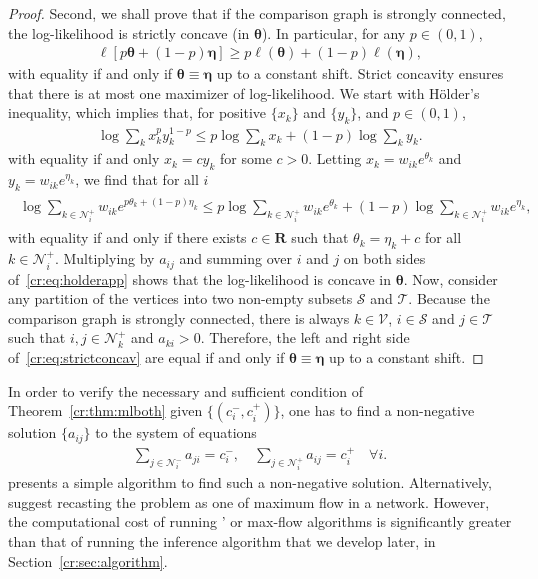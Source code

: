 \begin{proof}
Second, we shall prove that if the comparison graph is strongly connected, the log-likelihood is strictly concave (in $\bm{\theta}$).
In particular, for any $p \in (0,1)$,
\begin{align}
\label{cr:eq:strictconcav}
\ell \left[ p \bm{\theta} + (1-p) \bm{\eta} \right] \ge p \ell(\bm{\theta}) + (1-p) \ell(\bm{\eta}),
\end{align}
with equality if and only if $\bm{\theta} \equiv \bm{\eta}$ up to a constant shift.
Strict concavity ensures that there is at most one maximizer of log-likelihood.
We start with Hölder's inequality, which implies that, for positive $\{ x_k \}$ and $\{ y_k \}$, and $p \in (0,1)$,
\begin{align*}
\log \sum_k x_k^p y_k^{1-p} \le p \log \sum_k x_k + (1-p) \log \sum_k y_k.
\end{align*}
with equality if and only $x_k = c y_k$ for some $c > 0$.
Letting $x_k = w_{ik} e^{\theta_k}$ and $y_k = w_{ik} e^{\eta_k}$, we find that for all $i$
\begin{align}
\label{cr:eq:holderapp}
\begin{aligned}
\log \sum_{k \in \mathcal{N}^+_i} w_{ik} e^{p \theta_k + (1-p) \eta_k}
    \le p \log\!\sum_{k \in \mathcal{N}^+_i}\!w_{ik} e^{\theta_k} + (1-p) \log\!\sum_{k \in \mathcal{N}^+_i}\!w_{ik} e^{\eta_k},
\end{aligned}
\end{align}
with equality if and only if there exists $c \in \mathbf{R}$ such that $\theta_k = \eta_k + c$ for all $k \in \mathcal{N}^+_{i}$.
Multiplying by $a_{ij}$ and summing over $i$ and $j$ on both sides of~\eqref{cr:eq:holderapp} shows that the log-likelihood is concave in $\bm{\theta}$.
Now, consider any partition of the vertices into two non-empty subsets $\mathcal{S}$ and $\mathcal{T}$.
Because the comparison graph is strongly connected, there is always $k \in \mathcal{V}$, $i \in \mathcal{S}$ and $j \in \mathcal{T}$ such that $i, j \in \mathcal{N}^+_k$ and $a_{ki} > 0$.
Therefore, the left and right side of~\eqref{cr:eq:strictconcav} are equal if and only if $\bm{\theta} \equiv \bm{\eta}$ up to a constant shift.
\end{proof}

In order to verify the necessary and sufficient condition of Theorem~\ref{cr:thm:mlboth} given $\{ (c^-_i, c^+_i) \}$, one has to find a non-negative solution $\{ a_{ij} \}$ to the system of equations
\begin{align*}
\sum_{j \in \mathcal{N}^-_i} a_{ji} = c^-_i, \quad
\sum_{j \in \mathcal{N}^+_i} a_{ij} = c^+_i \quad \forall i.
\end{align*}
\citet{dines1926positive} presents a simple algorithm to find such a non-negative solution.
Alternatively, \citet{kumar2015inverting} suggest recasting the problem as one of maximum flow in a network.
However, the computational cost of running \citeauthor{dines1926positive}' or max-flow algorithms is significantly greater than that of running the inference algorithm that we develop later, in Section~\ref{cr:sec:algorithm}.

